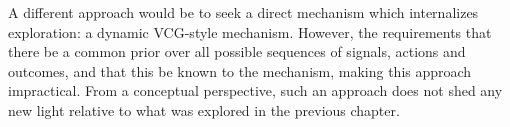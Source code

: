 




A different approach would be to seek a direct mechanism which internalizes exploration: a dynamic VCG-style mechanism.
However, the requirements that there be a common prior over all possible sequences of signals, actions and outcomes, and that this be known to the mechanism, making this approach  impractical. 
From a conceptual perspective, such an approach does not shed any new light relative to what was explored in the previous chapter.



